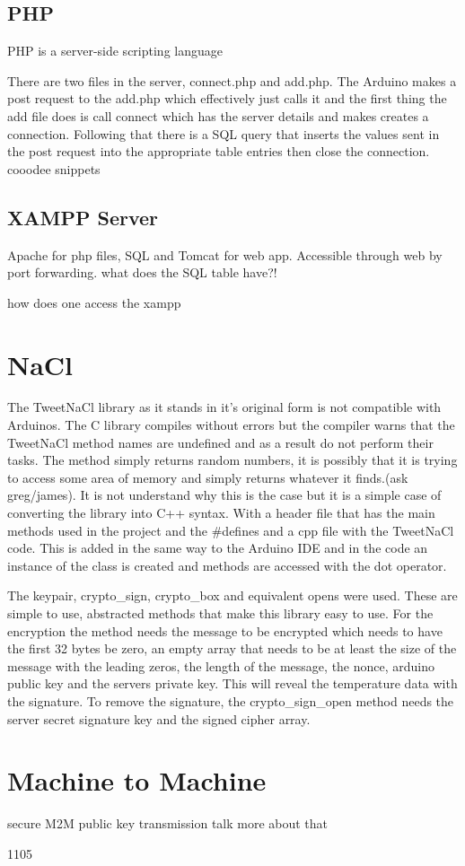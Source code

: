 \subsection{PHP}
PHP is a server-side scripting language 

There are two files in the server, connect.php and add.php. The Arduino makes a post request to the add.php which effectively just calls it and the first thing the add file does is call connect which has the server details and makes creates a connection. Following that there is a SQL query that inserts the values sent in the post request into the appropriate table entries then close the connection. cooodee snippets

\subsection{XAMPP Server}
Apache for php files, SQL and Tomcat for web app. Accessible through web by port forwarding.
what does the SQL table have?!

how does one access the xampp


\section{NaCl}

The TweetNaCl library as it stands in it's original form is not compatible with Arduinos. The C library compiles without errors but the compiler warns that the TweetNaCl method names are undefined and as a result do not perform their tasks. The method simply returns random numbers, it is possibly that it is trying to access some area of memory and simply returns whatever it finds.(ask greg/james). It is not understand why this is the case but it is a simple case of converting the library into C++ syntax. With a header file that has the main methods used in the project and the \#defines and a cpp file with the TweetNaCl code. This is added in the same way to the Arduino IDE and in the code an instance of the class is created and methods are accessed with the dot operator.

The keypair, crypto\_sign, crypto\_box and equivalent opens were used. These are simple to use, abstracted methods that make this library easy to use. For the encryption the method needs the message to be encrypted which needs to have the first 32 bytes be zero, an empty array that needs to be at least the size of the message with the leading zeros, the length of the message, the nonce, arduino public key and the servers private key. This will reveal the temperature data with the signature. To remove the signature, the crypto\_sign\_open method needs the server secret signature key and the signed cipher array.

\section{Machine to Machine}


secure M2M public key transmission
talk more about that


1105
